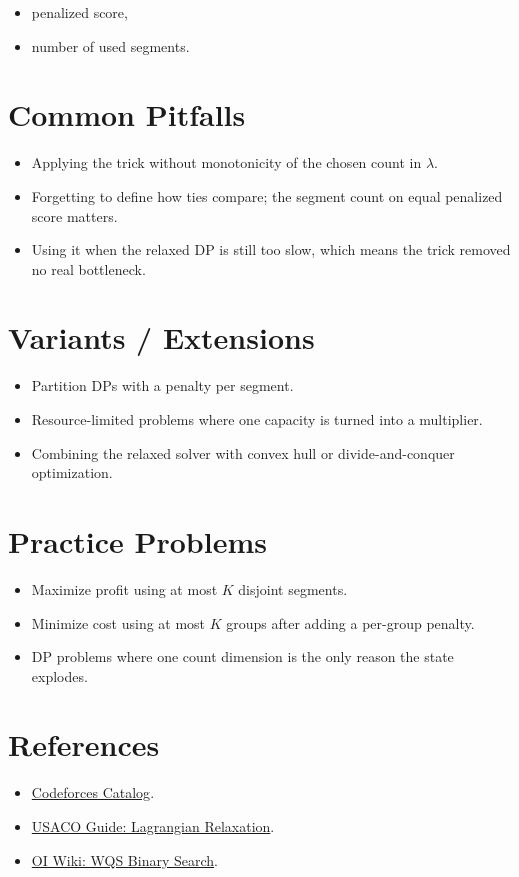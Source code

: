 \begin{itemize}
  \item penalized score,
  \item number of used segments.
\end{itemize}

\section*{Common Pitfalls}

\begin{itemize}
  \item Applying the trick without monotonicity of the chosen count in \(\lambda\).
  \item Forgetting to define how ties compare; the segment count on equal penalized score matters.
  \item Using it when the relaxed DP is still too slow, which means the trick removed no real bottleneck.
\end{itemize}

\section*{Variants / Extensions}

\begin{itemize}
  \item Partition DPs with a penalty per segment.
  \item Resource-limited problems where one capacity is turned into a multiplier.
  \item Combining the relaxed solver with convex hull or divide-and-conquer optimization.
\end{itemize}

\section*{Practice Problems}

\begin{itemize}
  \item Maximize profit using at most \(K\) disjoint segments.
  \item Minimize cost using at most \(K\) groups after adding a per-group penalty.
  \item DP problems where one count dimension is the only reason the state explodes.
\end{itemize}

\section*{References}

\begin{itemize}
  \item \href{https://codeforces.com/catalog}{Codeforces Catalog}.
  \item \href{https://usaco.guide/adv/lagrange?lang=cpp}{USACO Guide: Lagrangian Relaxation}.
  \item \href{https://oiwiki.com/dp/opt/wqs-binary-search/}{OI Wiki: WQS Binary Search}.
\end{itemize}
